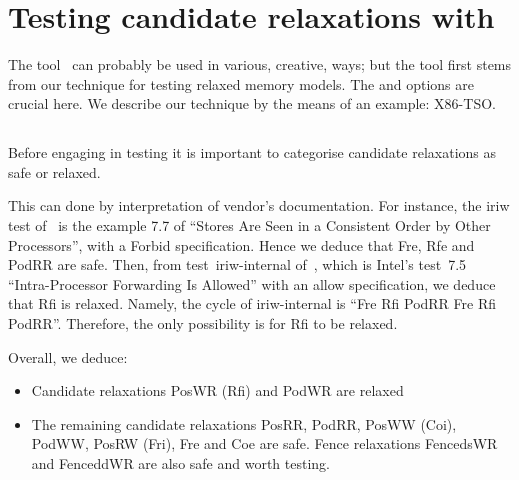 \section{Testing\label{diy:intro} candidate relaxations with \diy}

The tool~\diy{} can probably be used in various, creative, ways;
but the tool first stems from our technique for testing relaxed memory
models.
The  and  options are crucial here.
We describe our technique by the means of an example: X86-TSO.

\subsection{}

Before engaging in testing it is important to categorise
candidate relaxations as safe or relaxed.

This can done by interpretation of vendor's documentation.
For instance, the iriw test of~\mysec{\ref{iriw}} is the example 7.7 of
\cite{intel:white}
``Stores Are Seen in a Consistent Order by Other Processors'',
with a Forbid specification.
Hence we deduce that Fre, Rfe and PodRR are safe.
Then, from test~iriw-internal of~\mysec{\ref{iriw}},
which is Intel's test~7.5 ``Intra-Processor Forwarding Is Allowed''
with an allow specification,
we deduce that Rfi is relaxed.
Namely, the cycle of iriw-internal is
``Fre Rfi PodRR Fre Rfi PodRR''. Therefore, the only possibility is for
Rfi to be relaxed.

Overall, we deduce:
\begin{itemize}
\item Candidate relaxations PosWR (Rfi) and PodWR are relaxed
\item The remaining candidate relaxations PosRR, PodRR, PosWW (Coi),  PodWW,
PosRW (Fri), Fre and Coe are safe.
Fence relaxations FencedsWR and FenceddWR are also safe
and worth testing.
\end{itemize}

